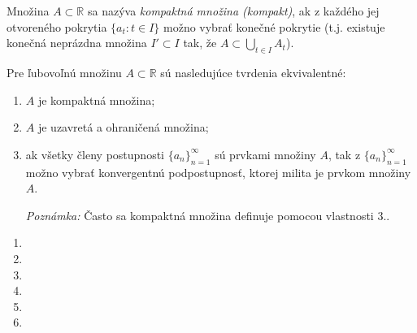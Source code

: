 Množina $A \subset \mathbb{R}$ sa nazýva \textit{kompaktná množina (kompakt)}, ak z každého jej otvoreného pokrytia $\{a_t: t \in I\}$ možno vybrať konečné pokrytie (t.j. existuje konečná neprázdna množina $I' \subset I$ tak, že $A \subset \bigcup_{t \in I} A_t$).

\begin{veta}
Pre ľubovoľnú množinu $A \subset \mathbb{R}$ sú nasledujúce tvrdenia ekvivalentné:
\begin{enumerate}
\item $A$ je kompaktná množina;
\item $A$ je uzavretá a ohraničená množina;
\item ak všetky členy postupnosti ${\{a_n\}}_{n=1}^\infty$ sú prvkami množiny $A$, tak z ${\{a_n\}}_{n=1}^\infty$ možno vybrať konvergentnú podpostupnosť, ktorej milita je prvkom množiny $A$.

\textit{Poznámka:}
Často sa kompaktná množina definuje pomocou vlastnosti $3.$.
\end{enumerate}
\end{veta}

\begin{enumerate}[resume]
	\item {}
	\item {}
	\item {}
	\item {}
	\item {}
	\item {}
\end{enumerate}